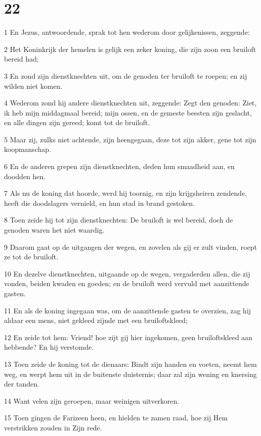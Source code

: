 \chapter{22}

\par 1 En Jezus, antwoordende, sprak tot hen wederom door gelijkenissen, zeggende:
\par 2 Het Koninkrijk der hemelen is gelijk een zeker koning, die zijn zoon een bruiloft bereid had;
\par 3 En zond zijn dienstknechten uit, om de genoden ter bruiloft te roepen; en zij wilden niet komen.
\par 4 Wederom zond hij andere dienstknechten uit, zeggende: Zegt den genoden: Ziet, ik heb mijn middagmaal bereid; mijn ossen, en de gemeste beesten zijn geslacht, en alle dingen zijn gereed; komt tot de bruiloft.
\par 5 Maar zij, zulks niet achtende, zijn heengegaan, deze tot zijn akker, gene tot zijn koopmanschap.
\par 6 En de anderen grepen zijn dienstknechten, deden hun smaadheid aan, en doodden hen.
\par 7 Als nu de koning dat hoorde, werd hij toornig, en zijn krijgsheiren zendende, heeft die doodslagers vernield, en hun stad in brand gestoken.
\par 8 Toen zeide hij tot zijn dienstknechten: De bruiloft is wel bereid, doch de genoden waren het niet waardig.
\par 9 Daarom gaat op de uitgangen der wegen, en zovelen als gij er zult vinden, roept ze tot de bruiloft.
\par 10 En dezelve dienstknechten, uitgaande op de wegen, vergaderden allen, die zij vonden, beiden kwaden en goeden; en de bruiloft werd vervuld met aanzittende gasten.
\par 11 En als de koning ingegaan was, om de aanzittende gasten te overzien, zag hij aldaar een mens, niet gekleed zijnde met een bruiloftskleed;
\par 12 En zeide tot hem: Vriend! hoe zijt gij hier ingekomen, geen bruiloftskleed aan hebbende? En hij verstomde.
\par 13 Toen zeide de koning tot de dienaars: Bindt zijn handen en voeten, neemt hem weg, en werpt hem uit in de buitenste duisternis; daar zal zijn wening en knersing der tanden.
\par 14 Want velen zijn geroepen, maar weinigen uitverkoren.
\par 15 Toen gingen de Farizeen heen, en hielden te zamen raad, hoe zij Hem verstrikken zouden in Zijn rede.
